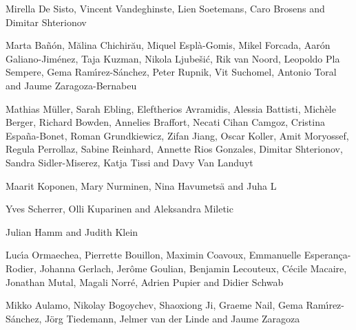 %
    {Mirella De Sisto, Vincent Vandeghinste, Lien Soetemans, Caro Brosens and Dimitar Shterionov}

%
    {Marta Ba\~{n}\'{o}n, M\u{a}lina Chichir\u{a}u, Miquel Espl\`{a}-Gomis, Mikel Forcada, Aar\'{o}n Galiano-Jim\'{e}nez, Taja Kuzman, Nikola Ljube\v{s}i\'{c}, Rik van Noord, Leopoldo Pla Sempere, Gema Ram\'{\i}rez-S\'{a}nchez, Peter Rupnik, Vit Suchomel, Antonio Toral and Jaume Zaragoza-Bernabeu}

%
    {Mathias M\"{u}ller, Sarah Ebling, Eleftherios Avramidis, Alessia Battisti, Mich\`{e}le Berger, Richard Bowden, Annelies Braffort, Necati Cihan Camgoz, Cristina Espa\~{n}a-Bonet, Roman Grundkiewicz, Zifan Jiang, Oscar Koller, Amit Moryossef, Regula Perrollaz, Sabine Reinhard, Annette Rios Gonzales, Dimitar Shterionov, Sandra Sidler-Miserez, Katja Tissi and Davy Van Landuyt}

%
    {Maarit Koponen, Mary Nurminen, Nina Havumets\"{a} and Juha L\aang}

%
    {Yves Scherrer, Olli Kuparinen and Aleksandra Miletic}

%
    {Julian Hamm and Judith Klein}

%
    {Luc\'{\i}a Ormaechea, Pierrette Bouillon, Maximin Coavoux, Emmanuelle Esperan\c{c}a-Rodier, Johanna Gerlach, Jer\^{o}me Goulian, Benjamin Lecouteux, C\'{e}cile Macaire, Jonathan Mutal, Magali Norr\'{e}, Adrien Pupier and Didier Schwab}

%
    {Mikko Aulamo, Nikolay Bogoychev, Shaoxiong Ji, Graeme Nail, Gema Ram\'{\i}rez-S\'{a}nchez, J\"{o}rg Tiedemann, Jelmer van der Linde and Jaume Zaragoza}

